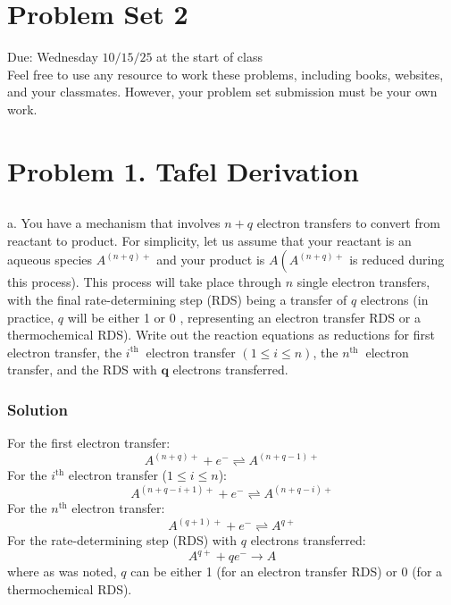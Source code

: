 \documentclass[12pt]{article}
\begin{document}
\section*{Problem Set 2}
Due: Wednesday $10 / 15 / 25$ at the start of class\\
Feel free to use any resource to work these problems, including books, websites, and your classmates. However, your problem set submission must be your own work.

\section{Problem 1. Tafel Derivation}
\subsection{}
a. You have a mechanism that involves $n+q$ electron transfers to convert from reactant to product. For simplicity, let us assume that your reactant is an aqueous species $A^{(n+q)+}$ and your product is $A\left(A^{(n+q)+}\right.$ is reduced during this process). This process will take place through $n$ single electron transfers, with the final rate-determining step (RDS) being a transfer of $q$ electrons (in practice, $q$ will be either 1 or 0 , representing an electron transfer RDS or a thermochemical RDS). Write out the reaction equations as reductions for first electron transfer, the $i^{\text {th }}$ electron transfer $(1 \leq i \leq n)$, the $n^{\text {th }}$ electron transfer, and the RDS with $\boldsymbol{q}$ electrons transferred.\\
\subsubsection{Solution}
For the first electron transfer:
\begin{equation}
A^{(n+q)+} + e^- \rightleftharpoons A^{(n+q-1)+}
\end{equation}
For the $i^{\text{th}}$ electron transfer ($1 \leq i \leq n$):
\begin{equation}
A^{(n+q-i+1)+} + e^- \rightleftharpoons A^{(n+q-i)+}
\end{equation}
For the $n^{\text{th}}$ electron transfer:
\begin{equation}
A^{(q+1)+} + e^- \rightleftharpoons A^{q+}
\end{equation}
For the rate-determining step (RDS) with $q$ electrons transferred:
\begin{equation}    
A^{q+} + q e^- \rightarrow A
\end{equation}
where as was noted, $q$ can be either 1 (for an electron transfer RDS) or 0 (for a thermochemical RDS).
\end{document}

